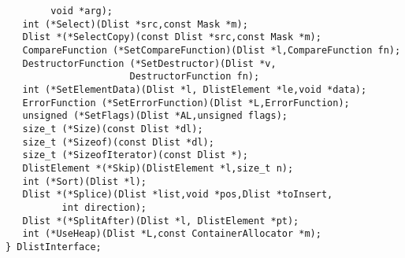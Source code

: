 \begin{verbatim}
        void *arg);
   int (*Select)(Dlist *src,const Mask *m);
   Dlist *(*SelectCopy)(const Dlist *src,const Mask *m);
   CompareFunction (*SetCompareFunction)(Dlist *l,CompareFunction fn);
   DestructorFunction (*SetDestructor)(Dlist *v,
                      DestructorFunction fn);
   int (*SetElementData)(Dlist *l, DlistElement *le,void *data);
   ErrorFunction (*SetErrorFunction)(Dlist *L,ErrorFunction);
   unsigned (*SetFlags)(Dlist *AL,unsigned flags);
   size_t (*Size)(const Dlist *dl);
   size_t (*Sizeof)(const Dlist *dl);
   size_t (*SizeofIterator)(const Dlist *);
   DlistElement *(*Skip)(DlistElement *l,size_t n);
   int (*Sort)(Dlist *l);
   Dlist *(*Splice)(Dlist *list,void *pos,Dlist *toInsert,
          int direction);
   Dlist *(*SplitAfter)(Dlist *l, DlistElement *pt);
   int (*UseHeap)(Dlist *L,const ContainerAllocator *m);
} DlistInterface;
\end{verbatim}
